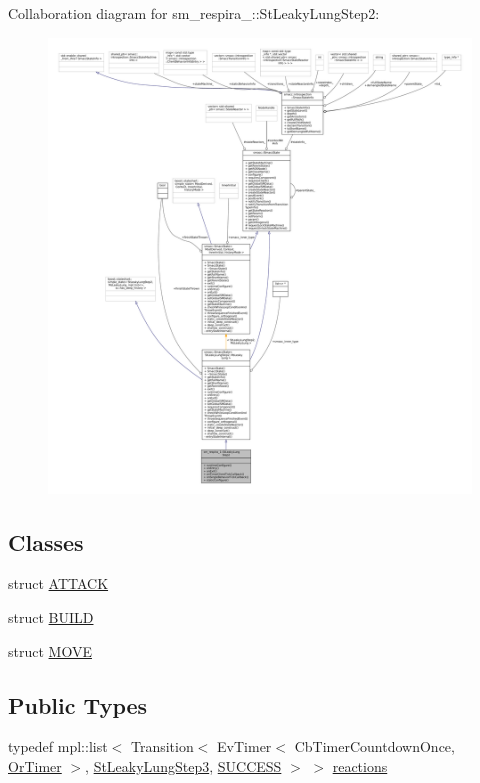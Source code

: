 Collaboration diagram for sm\+\_\+respira\+\_\+:\+:St\+Leaky\+Lung\+Step2\+:
\nopagebreak
\begin{figure}[H]
\begin{center}
\leavevmode
\includegraphics[width=350pt]{structsm__respira__1_1_1StLeakyLungStep2__coll__graph}
\end{center}
\end{figure}
\subsection*{Classes}
\begin{DoxyCompactItemize}
\item 
struct \hyperlink{structsm__respira__1_1_1StLeakyLungStep2_1_1ATTACK}{A\+T\+T\+A\+CK}
\item 
struct \hyperlink{structsm__respira__1_1_1StLeakyLungStep2_1_1BUILD}{B\+U\+I\+LD}
\item 
struct \hyperlink{structsm__respira__1_1_1StLeakyLungStep2_1_1MOVE}{M\+O\+VE}
\end{DoxyCompactItemize}
\subsection*{Public Types}
\begin{DoxyCompactItemize}
\item 
typedef mpl\+::list$<$ Transition$<$ Ev\+Timer$<$ Cb\+Timer\+Countdown\+Once, \hyperlink{classsm__respira__1_1_1OrTimer}{Or\+Timer} $>$, \hyperlink{structsm__respira__1_1_1StLeakyLungStep3}{St\+Leaky\+Lung\+Step3}, \hyperlink{classSUCCESS}{S\+U\+C\+C\+E\+SS} $>$ $>$ \hyperlink{structsm__respira__1_1_1StLeakyLungStep2_a6f3328bf0e1d12655e24a208d19ca9e2}{reactions}
\end{DoxyCompactItemize}
